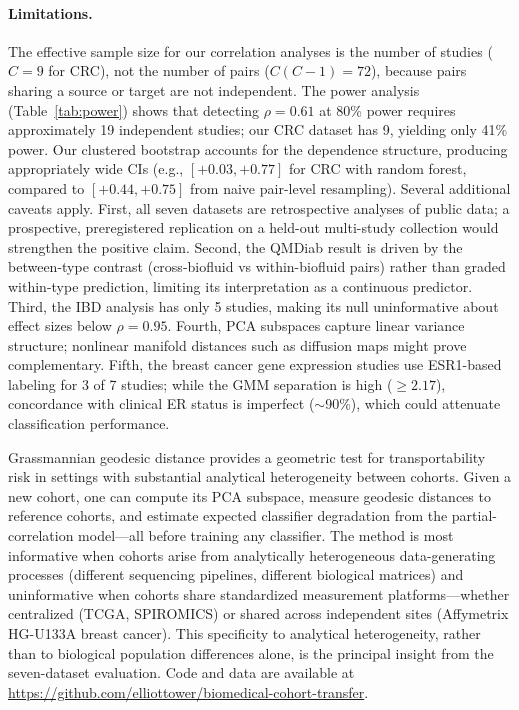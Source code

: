 \documentclass{article}
\begin{document}
\paragraph{Limitations.} The effective sample size for our correlation analyses is the number of studies ($C = 9$ for CRC), not the number of pairs ($C(C-1) = 72$), because pairs sharing a source or target are not independent. The power analysis (Table~\ref{tab:power}) shows that detecting $\rho = 0.61$ at 80\% power requires approximately 19 independent studies; our CRC dataset has 9, yielding only 41\% power. Our clustered bootstrap accounts for the dependence structure, producing appropriately wide CIs (e.g., $[+0.03, +0.77]$ for CRC with random forest, compared to $[+0.44, +0.75]$ from naive pair-level resampling). Several additional caveats apply. First, all seven datasets are retrospective analyses of public data; a prospective, preregistered replication on a held-out multi-study collection would strengthen the positive claim. Second, the QMDiab result is driven by the between-type contrast (cross-biofluid vs within-biofluid pairs) rather than graded within-type prediction, limiting its interpretation as a continuous predictor. Third, the IBD analysis has only 5 studies, making its null uninformative about effect sizes below $\rho = 0.95$. Fourth, PCA subspaces capture linear variance structure; nonlinear manifold distances such as diffusion maps \citep{conway1996functions} might prove complementary. Fifth, the breast cancer gene expression studies use ESR1-based labeling for 3 of 7 studies; while the GMM separation is high ($\geq 2.17$), concordance with clinical ER status is imperfect ($\sim$90\%), which could attenuate classification performance.

Grassmannian geodesic distance provides a geometric test for transportability risk in settings with substantial analytical heterogeneity between cohorts. Given a new cohort, one can compute its PCA subspace, measure geodesic distances to reference cohorts, and estimate expected classifier degradation from the partial-correlation model---all before training any classifier. The method is most informative when cohorts arise from analytically heterogeneous data-generating processes (different sequencing pipelines, different biological matrices) and uninformative when cohorts share standardized measurement platforms---whether centralized (TCGA, SPIROMICS) or shared across independent sites (Affymetrix HG-U133A breast cancer). This specificity to analytical heterogeneity, rather than to biological population differences alone, is the principal insight from the seven-dataset evaluation. Code and data are available at \url{https://github.com/elliottower/biomedical-cohort-transfer}.
\end{document}
